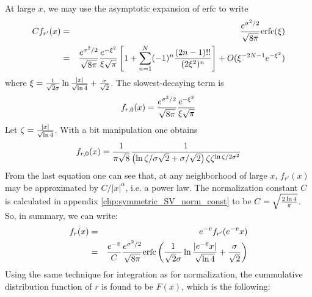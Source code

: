 At large $x$, we may use the asymptotic expansion of $\mathrm{erfc}$
to write
\begin{eqnarray*}
  Cf_{r'}(x) &=& {e^{\sigma^2 / 2} \over \sqrt{8\pi}} \mathrm{erfc}(\xi) \\
  &=& {e^{\sigma^2 / 2} \over \sqrt{8 \pi}}
  \frac{e^{-\xi^2}}{\xi\sqrt{\pi}}\left[
    1 +
    \sum_{n=1}^N (-1)^n \frac{(2n-1)!!}{(2\xi^2)^n} \right] +
  O(\xi^{-2N-1} e^{-\xi^2})
\end{eqnarray*}
where $\xi = {1 \over \sqrt{2}\sigma} \ln{|x| \over \sqrt{\ln 4}} +
{\sigma \over \sqrt{2}}$. The slowest-decaying term is
\[
f_{r,0}(x) = {e^{\sigma^2 / 2} \over \sqrt{8\pi}}
\frac{e^{-\xi^2}}{\xi\sqrt{\pi}}
\]
Let $\zeta = {|x| \over \sqrt{\ln 4}}$. With a bit manipulation one
obtains
\begin{equation*}
  f_{r,0}(x) = {1 \over \pi \sqrt{8}}{1 \over
    \left(\ln\zeta/\sigma\sqrt{2} +
      \sigma/\sqrt{2}\right)\zeta\zeta^{\ln \zeta / 2\sigma^2}
  }
\end{equation*}
From the last equation one can see that, at any neighborhood of large
$x$, $f_{r'}(x)$ may be approximated by $C/|x|^\alpha$, i.e. a power law.
The normalization constant $C$ is calculated in appendix
\ref{chp:symmetric_SV_norm_const} to be $C = \sqrt{2 \ln 4\over
  \pi}$. So, in summary, we can write:
\begin{eqnarray*}
  f_r(x) &=& e^{-\bar{v}} f_{r'}(e^{-\bar{v}} x) \\
    &=& {e^{-\bar{v}} \over C}{e^{\sigma^2 / 2} \over \sqrt{8\pi}}
    \text{erfc} \left({1 \over \sqrt{2}\sigma} \ln{|e^{-\bar{v}}x| \over \sqrt{\ln
          4}} + {\sigma \over \sqrt{2}}
    \right) \\
\end{eqnarray*}
Using the same technique for integration as for normalization, the
cummulative distribution function of $r$ is found to be $F(x)$,
which is the following:
